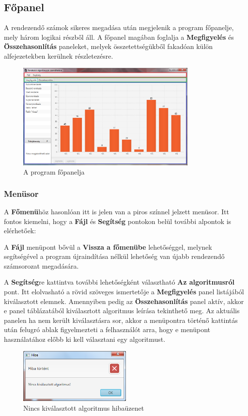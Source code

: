 \documentclass{elteikthesis}
\begin{document}
\subsection{Főpanel}
A rendezendő számok sikeres megadása után megjelenik a program főpanelje, mely három logikai részből áll. A főpanel magában foglalja a \textbf{Megfigyelés} és \textbf{Összehasonlítás} paneleket, melyek összetettségükből fakadóan külön alfejezetekben kerülnek részletezésre.
 \begin{figure}[H]
 	\centering
 	\includegraphics[width=0.8\textwidth]{pics/mainpanel.png}
 	\caption{A program főpanelja}
 \end{figure}
\subsubsection{Menüsor}
A \textbf{Főmenü}höz hasonlóan itt is jelen van a piros színnel jelzett menüsor. Itt fontos kiemelni, hogy a \textbf{Fájl} és \textbf{Segítség} pontokon belül további alpontok is elérhetőek:\par
A \textbf{Fájl} menüpont bővül a \textbf{Vissza a főmenübe} lehetőséggel, melynek segítségével a program újraindítása nélkül lehetőség van újabb rendezendő számsorozat megadására.\par
A \textbf{Segítség}re kattintva további lehetőségként választható \textbf{Az algoritmusról} pont. Itt elolvasható a rövid szöveges ismertetője a \textbf{Megfigyelés} panel listájából kiválasztott elemnek. Amennyiben pedig az \textbf{Összehasonlítás} panel aktív, akkor e panel táblázatából kiválasztott algoritmus leírása tekinthető meg. Az aktuális panelen ha nem került kiválasztásra sor, akkor a menüpontra történő kattintás után felugró ablak figyelmezteti a felhasználót arra, hogy e menüpont használatához előbb ki kell választani egy algoritmust.
 \begin{figure}[H]
 	\centering
 	\includegraphics[width=0.5\textwidth]{pics/algorithm_error.png}
 	\caption{Nincs kiválasztott algoritmus hibaüzenet}
 \end{figure}
\end{document}
